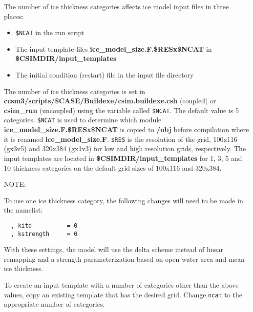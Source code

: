 
The number of ice thickness categories affects ice model input files in three
places:
  \begin{itemize}
    \item {\tt \$NCAT} in the run script
    \item The input template files {\bf ice\_model\_size.F.\$RESx\$NCAT}
    in {\bf \$CSIMDIR/input\_templates}
    \item The initial condition (restart) file in the input file directory
  \end{itemize}

The number of ice thickness categories is set in 
{\bf ccsm3/scripts/\$CASE/Buildexe/csim.buildexe.csh} (coupled) or
{\bf csim\_run} (uncoupled) using the variable called {\tt \$NCAT}.  The
default value is 5 categories. {\tt \$NCAT} is used to determine which module
{\bf ice\_model\_size.F.\$RESx\$NCAT} is copied to {\bf /obj} before
compilation where it is renamed {\bf ice\_model\_size.F}.  {\tt \$RES} is the
resolution of the grid, 100x116 (gx3v5) and 320x384 (gx1v3) for low and
high resolution grids, respectively.  The input templates
are located in {\bf \$CSIMDIR/input\_templates} for 1, 3, 5 and 10
thickness categories on the default grid sizes of 100x116 and 320x384.

\begin{Ventry}{NOTE:}
\item[NOTE]
To use one ice thickness category, the following changes will need to be
made in the namelist: \\

\begin{verbatim}
  , kitd          = 0
  , kstrength     = 0
\end{verbatim}

With these settings, the model will use the delta scheme instead of linear
remapping and a strength parameterization based on open water area and
mean ice thickness.

\end{Ventry}

To create an input template with a number of categories other than the above
values, copy an existing template that has the desired grid. Change {\tt ncat}
to the appropriate number of categories. 

